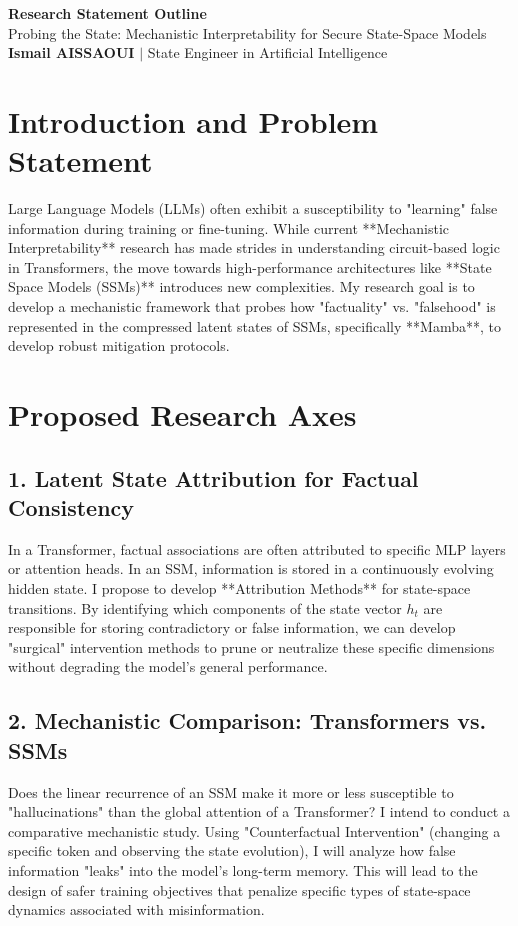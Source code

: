 \documentclass[11pt,a4paper]{article}
\begin{document}
\begin{center}
    {\LARGE\bfseries\color{ucphred} Research Statement Outline}\\[6pt]
    {\large Probing the State: Mechanistic Interpretability for Secure State-Space Models}\\[4pt]
    \textbf{Ismail AISSAOUI} $|$ State Engineer in Artificial Intelligence
\end{center}

\bigskip

\section{Introduction and Problem Statement}
Large Language Models (LLMs) often exhibit a susceptibility to "learning" false information during training or fine-tuning. While current **Mechanistic Interpretability** research has made strides in understanding circuit-based logic in Transformers, the move towards high-performance architectures like **State Space Models (SSMs)** introduces new complexities. My research goal is to develop a mechanistic framework that probes how "factuality" vs. "falsehood" is represented in the compressed latent states of SSMs, specifically **Mamba**, to develop robust mitigation protocols.

\section{Proposed Research Axes}

\subsection{1. Latent State Attribution for Factual Consistency}
In a Transformer, factual associations are often attributed to specific MLP layers or attention heads. In an SSM, information is stored in a continuously evolving hidden state. I propose to develop **Attribution Methods** for state-space transitions. By identifying which components of the state vector $h_t$ are responsible for storing contradictory or false information, we can develop "surgical" intervention methods to prune or neutralize these specific dimensions without degrading the model's general performance.

\subsection{2. Mechanistic Comparison: Transformers vs. SSMs}
Does the linear recurrence of an SSM make it more or less susceptible to "hallucinations" than the global attention of a Transformer? I intend to conduct a comparative mechanistic study. Using "Counterfactual Intervention" (changing a specific token and observing the state evolution), I will analyze how false information "leaks" into the model's long-term memory. This will lead to the design of safer training objectives that penalize specific types of state-space dynamics associated with misinformation.
\end{document}
